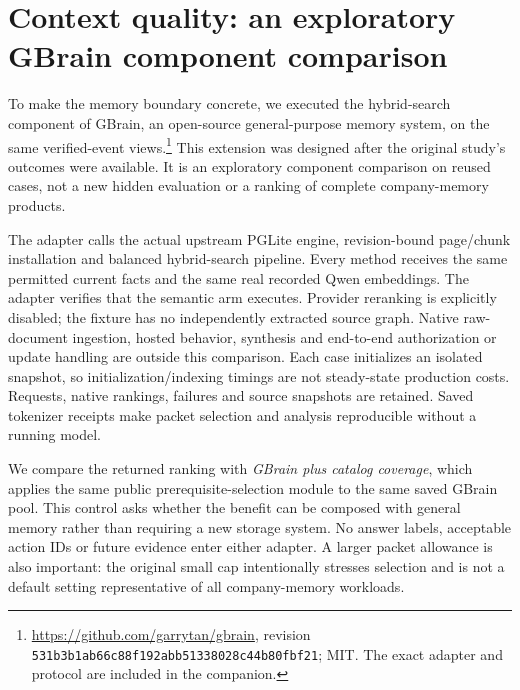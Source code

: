 \section{Context quality: an exploratory GBrain component comparison}
\label{sec:context-extension}
To make the memory boundary concrete, we executed the hybrid-search component of GBrain, an open-source general-purpose memory system, on the same verified-event views.\footnote{\url{https://github.com/garrytan/gbrain}, revision \texttt{531b3b1ab66c88f192abb51338028c44b80fbf21}; MIT. The exact adapter and protocol are included in the companion.} This extension was designed after the original study's outcomes were available. It is an exploratory component comparison on reused cases, not a new hidden evaluation or a ranking of complete company-memory products.

The adapter calls the actual upstream PGLite engine, revision-bound page/chunk installation and balanced hybrid-search pipeline. Every method receives the same permitted current facts and the same real recorded Qwen embeddings. The adapter verifies that the semantic arm executes. Provider reranking is explicitly disabled; the fixture has no independently extracted source graph. Native raw-document ingestion, hosted behavior, synthesis and end-to-end authorization or update handling are outside this comparison. Each case initializes an isolated snapshot, so initialization/indexing timings are not steady-state production costs. Requests, native rankings, failures and source snapshots are retained. Saved tokenizer receipts make packet selection and analysis reproducible without a running model.

We compare the returned ranking with \emph{GBrain plus catalog coverage}, which applies the same public prerequisite-selection module to the same saved GBrain pool. This control asks whether the benefit can be composed with general memory rather than requiring a new storage system. No answer labels, acceptable action IDs or future evidence enter either adapter. A larger packet allowance is also important: the original small cap intentionally stresses selection and is not a default setting representative of all company-memory workloads.

\begin{table}[htbp]
\centering\small

\caption{Complete current support available among the 48 answerable fictional cases. Budgets include the common task/catalog instructions as well as evidence. This is context quality, with no downstream recommendation generated in this extension. All three allowances and the same-backend control are exploratory; the repeated queries do not increase the number of independent company worlds.}
\label{tab:context-budget}
\end{table}

